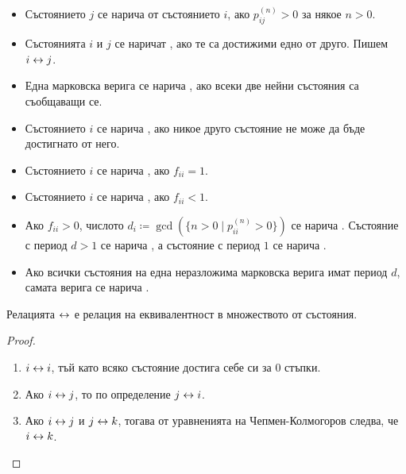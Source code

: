 \documentclass[numbers=endperiod, bibliography=totocnumbered]{scrartcl}
\begin{document}
\begin{definition}
  \mbox{}
  \begin{itemize}
    \item Състоянието \( j \) се нарича  от състоянието \( i \), ако \( p^{(n)}_{ij} > 0 \) за някое \( n > 0 \).
    \item Състоянията \( i \) и \( j \) се наричат , ако те са достижими едно от друго. Пишем \( i \leftrightarrow j \).
    \item Една марковска верига се нарича , ако всеки две нейни състояния са съобщаващи се.
    \item Състоянието \( i \) се нарича , ако никое друго състояние не може да бъде достигнато от него.
    \item Състоянието \( i \) се нарича , ако \( f_{ii} = 1 \).
    \item Състоянието \( i \) се нарича , ако \( f_{ii} < 1 \).
    \item Ако \( f_{ii} > 0 \), числото \( d_i \coloneqq \gcd (\{ n > 0 \mid p_{ii}^{(n)} > 0 \}) \) се нарича . Състояние с период \( d > 1 \) се нарича , а състояние с период \( 1 \) се нарича .
    \item Ако всички състояния на една неразложима марковска верига имат период \( d \), самата верига се нарича .
  \end{itemize}
\end{definition}

\begin{proposition}
  Релацията \( \leftrightarrow \) е релация на еквивалентност в множеството от състояния.
\end{proposition}
\begin{proof}
  \mbox{}
  \begin{enumerate}
    \item \( i \leftrightarrow i \), тъй като всяко състояние достига себе си за \( 0 \) стъпки.
    \item Ако \( i \leftrightarrow j \), то по определение \( j \leftrightarrow i \).
    \item Ако \( i \leftrightarrow j \) и \( j \leftrightarrow k \), тогава от уравненията на Чепмен-Колмогоров следва, че \( i \leftrightarrow k \).
  \end{enumerate}
\end{proof}
\end{document}
